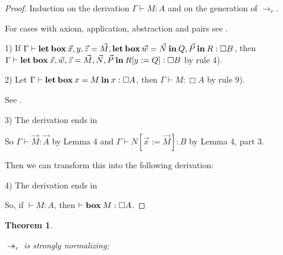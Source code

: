 \documentclass[a4paper]{article}
\newtheorem{theorem}{Theorem}
\begin{document}
\begin{proof}

Induction on the derivation $\Gamma \vdash M : A$ and on the generation of $\rightarrow_r$.

For cases with axiom, application, abstraction and pairs see \cite{Morten} \cite{Pierce}.

1) If $\Gamma \vdash {\bf let \: box \:} \vec{x}, y, \vec{z} = \vec{M}, {\bf let \: box \: } \vec{w} = \vec{N} {\bf \: in \: } Q, \vec{P}  {\: \bf in \:} R : \Box B$,
  then $\Gamma \vdash {\bf let \: box \:} \vec{x}, \vec{w}, \vec{z} = \vec{M}, \vec{N}, \vec{P} \: { \bf in } \: R [y := Q] : \Box B$ by rule 4).

2) Let $\Gamma \vdash {\bf let \: box \:} x = M {\: \bf in \: } x : \Box A$, then $\Gamma \vdash M : \Box A$ by rule 9).

See \cite{ModalK}.

3) The derivation ends in

\begin{prooftree}
\end{prooftree}

So $\Gamma \vdash \vec{M} : \vec{A}$ by Lemma 4 and $\Gamma \vdash N [\vec{x} := \vec{M}] : B$ by Lemma 4, part 3.

Then we can transform this into the following derivation:

\begin{prooftree}
\end{prooftree}

4) The derivation ends in

\begin{prooftree}
\end{prooftree}

So, if $\vdash M : A$, then $\vdash {\bf box \:} M : \Box A$.


\end{proof}

\begin{theorem}
  $ $

  $\twoheadrightarrow_r$ is strongly normalizing;
\end{theorem}
\end{document}
